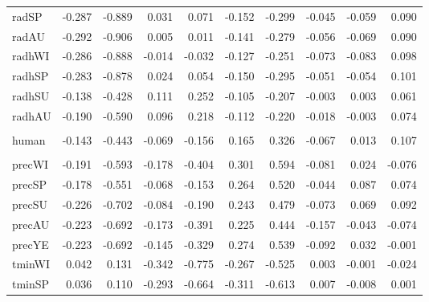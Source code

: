 \begin{table}[]
\begin{table}[H]
{\begin{tabular}{lrrrrrrrrr}
\hspace{1em}radSP & -0.287 & -0.889 & 0.031 & 0.071 & -0.152 & -0.299 & -0.045 & -0.059 & 0.090\\
\hspace{1em}radAU & -0.292 & -0.906 & 0.005 & 0.011 & -0.141 & -0.279 & -0.056 & -0.069 & 0.090\\
\hspace{1em}radhWI & -0.286 & -0.888 & -0.014 & -0.032 & -0.127 & -0.251 & -0.073 & -0.083 & 0.098\\
\hspace{1em}radhSP & -0.283 & -0.878 & 0.024 & 0.054 & -0.150 & -0.295 & -0.051 & -0.054 & 0.101\\
\hspace{1em}radhSU & -0.138 & -0.428 & 0.111 & 0.252 & -0.105 & -0.207 & -0.003 & 0.003 & 0.061\\
\hspace{1em}radhAU & -0.190 & -0.590 & 0.096 & 0.218 & -0.112 & -0.220 & -0.018 & -0.003 & 0.074\\
\addlinespace[0.3em]
\multicolumn{10}{l}{\textbf{Landscape}}\\
\hspace{1em}human & -0.143 & -0.443 & -0.069 & -0.156 & 0.165 & 0.326 & -0.067 & 0.013 & 0.107\\
\addlinespace[0.3em]
\multicolumn{10}{l}{\textbf{Climate}}\\
\hspace{1em}precWI & -0.191 & -0.593 & -0.178 & -0.404 & 0.301 & 0.594 & -0.081 & 0.024 & -0.076\\
\hspace{1em}precSP & -0.178 & -0.551 & -0.068 & -0.153 & 0.264 & 0.520 & -0.044 & 0.087 & 0.074\\
\hspace{1em}precSU & -0.226 & -0.702 & -0.084 & -0.190 & 0.243 & 0.479 & -0.073 & 0.069 & 0.092\\
\hspace{1em}precAU & -0.223 & -0.692 & -0.173 & -0.391 & 0.225 & 0.444 & -0.157 & -0.043 & -0.074\\
\hspace{1em}precYE & -0.223 & -0.692 & -0.145 & -0.329 & 0.274 & 0.539 & -0.092 & 0.032 & -0.001\\
\hspace{1em}tminWI & 0.042 & 0.131 & -0.342 & -0.775 & -0.267 & -0.525 & 0.003 & -0.001 & -0.024\\
\hspace{1em}tminSP & 0.036 & 0.110 & -0.293 & -0.664 & -0.311 & -0.613 & 0.007 & -0.008 & 0.001\\

\end{tabular}}
\end{table}
\end{table}
